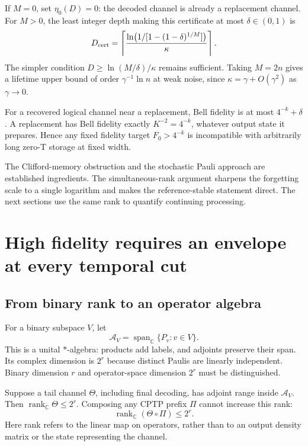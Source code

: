\documentclass[11pt,a4paper]{article}
\numberwithin{equation}{section}
\theoremstyle{remark}\newtheorem*{remark}{Interpretation}
\newcommand{\rank}{\operatorname{rank}}
\newcommand{\Span}{\operatorname{span}}
\newcommand{\A}{\mathcal A}
\begin{document}
If $M=0$, set $\eta_0(D)=0$: the decoded channel is already a replacement channel. For $M>0$, the least integer depth making this certificate at most $\delta\in(0,1)$ is
\begin{equation}
D_{\rm cert}=\left\lceil\frac{\ln\!\left(1/[1-(1-\delta)^{1/M}]\right)}{\kappa}\right\rceil.
\end{equation}
The simpler condition $D\ge\ln(M/\delta)/\kappa$ remains sufficient.
Taking $M=2n$ gives a lifetime upper bound of order $\gamma^{-1}\ln n$ at weak noise, since $\kappa=\gamma+O(\gamma^2)$ as $\gamma\to0$.

For a recovered logical channel near a replacement, Bell fidelity is at most $4^{-k}+\delta$. A replacement has Bell fidelity exactly $K^{-2}=4^{-k}$, whatever output state it prepares. Hence any fixed fidelity target $F_0>4^{-k}$ is incompatible with arbitrarily long zero-T storage at fixed width.

The Clifford-memory obstruction and the stochastic Pauli approach are established ingredients. The simultaneous-rank argument sharpens the forgetting scale to a single logarithm and makes the reference-stable statement direct. The next sections use the same rank to quantify continuing processing.

\section{High fidelity requires an envelope at every temporal cut}
\subsection{From binary rank to an operator algebra}
For a binary subspace $V$, let
\begin{equation}
\A_V=\Span_{\mathbb C}\{P_v:v\in V\}.
\end{equation}
This is a unital $*$-algebra: products add labels, and adjoints preserve their span. Its complex dimension is $2^r$ because distinct Paulis are linearly independent. Binary dimension $r$ and operator-space dimension $2^r$ must be distinguished.

Suppose a tail channel $\Theta$, including final decoding, has adjoint range inside $\A_V$. Then $\rank_{\mathbb C}\Theta\le2^r$. Composing any CPTP prefix $\Pi$ cannot increase this rank:
\begin{equation}
\rank_{\mathbb C}(\Theta\circ\Pi)\le2^r.
\label{eq:channelrank}
\end{equation}
Here rank refers to the linear map on operators, rather than to an output density matrix or the state representing the channel.
\end{document}
